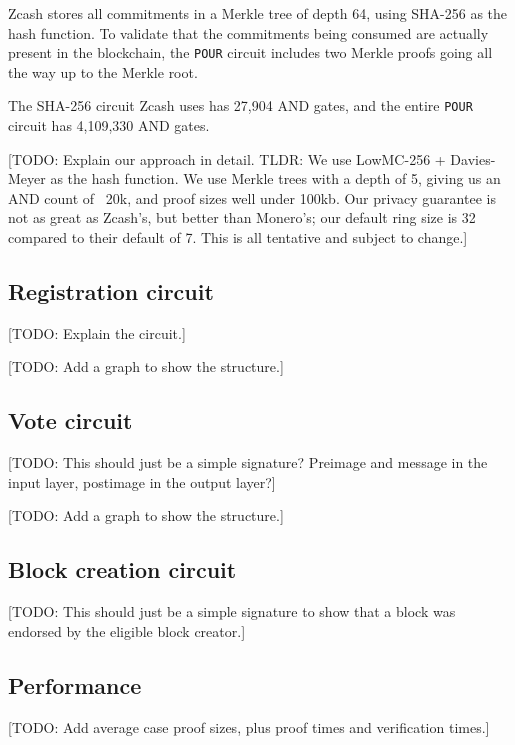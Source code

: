 
Zcash stores all commitments in a Merkle tree of depth 64, using SHA-256 as the hash function. To validate that the commitments being consumed are actually present in the blockchain, the \texttt{POUR} circuit includes two Merkle proofs going all the way up to the Merkle root.

The SHA-256 circuit Zcash uses has 27,904 AND gates, and the entire \texttt{POUR} circuit has 4,109,330 AND gates.

[TODO: Explain our approach in detail. TLDR: We use LowMC-256 \cite{albrecht2015ciphers} + Davies-Meyer as the hash function. We use Merkle trees with a depth of 5, giving us an AND count of ~20k, and proof sizes well under 100kb. Our privacy guarantee is not as great as Zcash's, but better than Monero's; our default ring size is 32 compared to their default of 7. This is all tentative and subject to change.]


\subsection{Registration circuit}
\label{registration-circuit}

[TODO: Explain the circuit.]

[TODO: Add a graph to show the structure.]


\subsection{Vote circuit}
\label{vote-circuit}

[TODO: This should just be a simple signature? Preimage and message in the input layer, postimage in the output layer?]

[TODO: Add a graph to show the structure.]


\subsection{Block creation circuit}
\label{block-creation-circuit}

[TODO: This should just be a simple signature to show that a block was endorsed by the eligible block creator.]


\subsection{Performance}

[TODO: Add average case proof sizes, plus proof times and verification times.]
